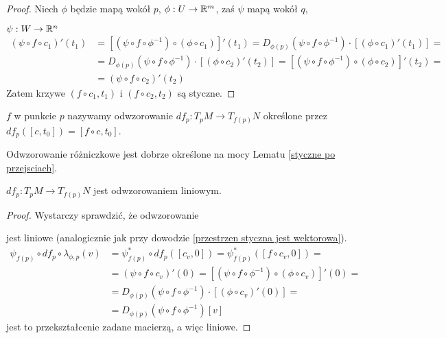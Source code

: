 \begin{proof}
  Niech $\phi$ będzie mapą wokół $p$, $\phi:U\to\mathbb{R}^m$, zaś $\psi$ mapą wokół $q$,

  $\psi:W\to\mathbb{R}^n$
  \begin{align*}(\psi\circ f\circ c_1)'(t_1)&=[(\psi\circ f\circ\phi^{-1})\circ(\phi\circ c_1)]'(t_1)=D_{\phi(p)}(\psi\circ f\circ \phi^{-1})\cdot[(\phi\circ c_1)'(t_1)]=\\
  &=D_{\phi(p)}(\psi\circ f\circ\phi^{-1})\cdot[(\phi\circ c_2)'(t_2)]=[(\psi\circ f\circ\phi^{-1})\circ(\phi\circ c_2)]'(t_2)=\\
  &=(\psi\circ f\circ c_2)'(t_2)\end{align*}
  Zatem krzywe $(f\circ c_1, t_1)$ i $(f\circ c_2, t_2)$ są styczne.
\end{proof}

\begin{definition}[różniczka]  $f$ w punkcie $p$ nazywamy odwzorowanie $df_p:T_pM\to T_{f(p)}N$ określone przez $df_p([c, t_0])=[f\circ c, t_0]$.
\end{definition}

Odwzorowanie różniczkowe jest dobrze określone na mocy Lematu \ref{styczne po przejsciach}.

\begin{lemma}
  $df_p:T_pM\to T_{f(p)}N$ jest odwzorowaniem liniowym.
\end{lemma}

\begin{proof}
  Wystarczy sprawdzić, że odwzorowanie

  \begin{center}\end{center}
  jest liniowe (analogicznie jak przy dowodzie \ref{przestrzen styczna jest wektorowa}). 
  \begin{align*}
    \psi_{f(p)}\circ df_p\circ\lambda_{\phi, p}(v)&=\psi_{f(p)}^*\circ df_p([c_v, 0])=\psi_{f(p)}^*([f\circ c_v, 0])=\\
                                                  &=(\psi\circ f\circ c_v)'(0)=[(\psi\circ f\circ \phi^{-1})\circ(\phi\circ c_v)]'(0)=\\
                                                  &=D_{\phi(p)}(\psi\circ f\circ\phi^{-1})\cdot[(\phi\circ c_v)'(0)]=\\
                                                  &=D_{\phi(p)}(\psi\circ f\circ \phi^{-1})[v]
  \end{align*}
  jest to przekształcenie zadane macierzą, a więc liniowe.
\end{proof}

